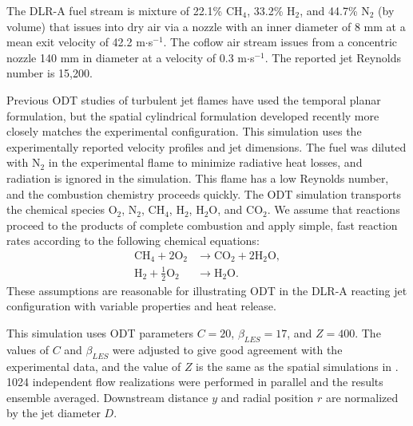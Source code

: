 \documentclass[preprint,12pt, a4paper]{elsarticle}
\begin{document}
The DLR-A fuel stream is mixture of 22.1\% CH$_4$, 33.2\% H$_2$, and 44.7\% N$_2$ (by volume) that issues into dry air via a nozzle with an inner diameter of 8 mm at a mean exit velocity of 42.2 m$\cdot$s$^{-1}$. The coflow air stream issues from a concentric nozzle 140 mm in diameter at a velocity of 0.3 m$\cdot$s$^{-1}$. The reported jet Reynolds number is 15,200.

Previous ODT studies of turbulent jet flames have used the temporal planar formulation, but the spatial cylindrical formulation developed recently \cite{Lignell_2018} more closely matches the experimental configuration. This simulation uses the experimentally reported velocity profiles and jet dimensions.  
The fuel was diluted with N$_2$ in the experimental flame to minimize radiative heat losses, and radiation is ignored in the simulation. This flame has a low Reynolds number, and the combustion chemistry proceeds quickly. The ODT simulation transports the chemical species O$_2$, N$_2$, CH$_4$, H$_2$, H$_2$O, and CO$_2$. We assume that reactions proceed to the products of complete combustion and apply simple, fast reaction rates according to the following chemical equations:
\begin{align}
	\mathrm{CH}_4 + 2\mathrm{O}_2 & \rightarrow \mathrm{CO}_2 + 2\mathrm{H}_2\mathrm{O}, \\
	\mathrm{H}_2+\frac{1}{2}\mathrm{O}_2 & \rightarrow \mathrm{H}_2\mathrm{O}.
\end{align}
These assumptions are reasonable for illustrating ODT in the DLR-A reacting jet configuration with variable properties and heat release. 

This simulation uses ODT parameters $C=20$, $\beta_{LES}=17$, and $Z=400$. The values of $C$ and $\beta_{LES}$ were adjusted to give good agreement with the experimental data, and the value of $Z$ is the same as the spatial simulations in \cite{Monson_2016}. 1024 independent flow realizations were performed in parallel and the results ensemble averaged. Downstream distance $y$ and radial position $r$ are normalized by the jet diameter $D$.
\end{document}
